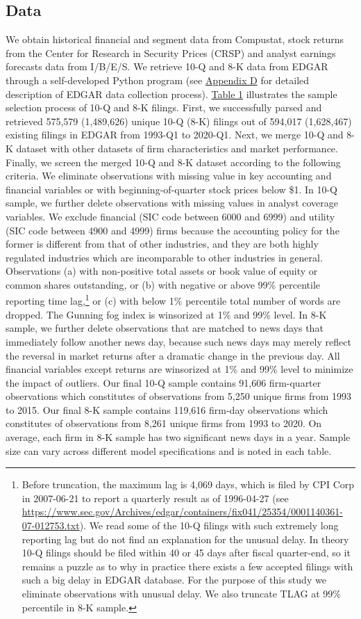 \documentclass[letterpaper,11pt]{article}
\begin{document}
\begin{spacing}{1.5}
\subsection{Data}
We obtain historical financial and segment data from Compustat, stock returns from the Center for Research in Security Prices (CRSP) and analyst earnings forecasts data from I/B/E/S. We retrieve 10-Q and 8-K data from EDGAR through a self-developed Python program (see \hyperref[appd]{Appendix D} for detailed description of EDGAR data collection process). \hyperref[T1]{Table 1} illustrates the sample selection process of 10-Q and 8-K filings. First, we successfully parsed and retrieved 575,579 (1,489,626) unique 10-Q (8-K) filings out of 594,017 (1,628,467) existing filings in EDGAR from 1993-Q1 to 2020-Q1. Next, we merge 10-Q and 8-K dataset with other datasets of firm characteristics and market performance. Finally, we screen the merged 10-Q and 8-K dataset according to the following criteria. We eliminate observations with missing value in key accounting and financial variables or with beginning-of-quarter stock prices below \$1. In 10-Q sample, we further delete observations with missing values in analyst coverage variables. We exclude financial (SIC code between 6000 and 6999) and utility (SIC code between 4900 and 4999) firms because the accounting policy for the former is different from that of other industries, and they are both highly regulated industries which are incomparable to other industries in general. Observations (a) with non-positive total assets or book value of equity or common shares outstanding, or (b) with negative or above 99\% percentile reporting time lag,\footnote{Before truncation, the maximum lag is 4,069 days, which is filed by CPI Corp in 2007-06-21 to report a quarterly result as of 1996-04-27 (see \url{https://www.sec.gov/Archives/edgar/containers/fix041/25354/0001140361-07-012753.txt}). We read some of the 10-Q filings with such extremely long reporting lag but do not find an explanation for the unusual delay. In theory 10-Q filings should be filed within 40 or 45 days after fiscal quarter-end, so it remains a puzzle as to why in practice there exists a few accepted filings with such a big delay in EDGAR database. For the purpose of this study we eliminate observations with unusual delay. We also truncate TLAG at 99\% percentile in 8-K sample.} or (c) with below 1\% percentile total number of words are dropped. The Gunning fog index is winsorized at 1\% and 99\% level. In 8-K sample, we further delete observations that are matched to news days that immediately follow another news day, because such news days may merely reflect the reversal in market returns after a dramatic change in the previous day. All financial variables except returns are winsorized at 1\% and 99\% level to minimize the impact of outliers. Our final 10-Q sample contains 91,606 firm-quarter observations which constitutes of observations from 5,250 unique firms from 1993 to 2015. Our final 8-K sample contains 119,616 firm-day observations which constitutes of observations from 8,261 unique firms from 1993 to 2020. On average, each firm in 8-K sample has two significant news days in a year. Sample size can vary across different model specifications and is noted in each table. 


\end{spacing}
\end{document}
